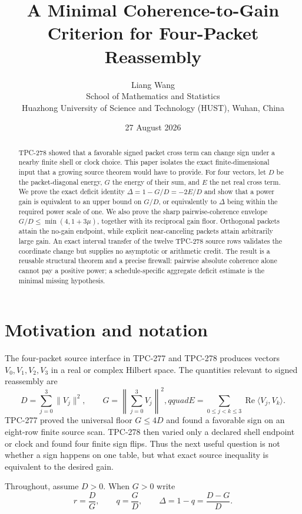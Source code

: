 \documentclass[11pt]{article}
\title{A Minimal Coherence-to-Gain Criterion for Four-Packet Reassembly}
\author{Liang Wang\\
School of Mathematics and Statistics\\
Huazhong University of Science and Technology (HUST), Wuhan, China}
\date{27 August 2026}
\begin{document}
\maketitle

\begin{abstract}
TPC-278 showed that a favorable signed packet cross term can change sign under
a nearby finite shell or clock choice.  This paper isolates the exact
finite-dimensional input that a growing source theorem would have to provide.
For four vectors, let $D$ be the packet-diagonal energy, $G$ the energy of
their sum, and $E$ the net real cross term.  We prove the exact deficit
identity $\Delta=1-G/D=-2E/D$ and show that a power gain is equivalent to an
upper bound on $G/D$, or equivalently to $\Delta$ being within the required
power scale of one.  We also prove the sharp pairwise-coherence envelope
$G/D\leq\min(4,1+3\mu)$, together with its reciprocal gain floor.  Orthogonal
packets attain the no-gain endpoint, while explicit near-canceling packets
attain arbitrarily large gain.  An exact interval transfer of the twelve
TPC-278 source rows validates the coordinate change but supplies no
asymptotic or arithmetic credit.  The result is a reusable structural
theorem and a precise firewall: pairwise absolute coherence alone cannot
pay a positive power; a schedule-specific aggregate deficit estimate is the
minimal missing hypothesis.
\end{abstract}

\section{Motivation and notation}

The four-packet source interface in TPC-277 and TPC-278 produces vectors
$V_0,V_1,V_2,V_3$ in a real or complex Hilbert space.  The quantities relevant
to signed reassembly are
\[
 D=\sum_{j=0}^3\|V_j\|^2,\qquad
 G=\left\|\sum_{j=0}^3V_j\right\|^2,qquad
 E=\sum_{0\leq j<k\leq3}\operatorname{Re}\langle V_j,V_k\rangle.
\]
TPC-277 proved the universal floor $G\leq4D$ and found a favorable sign on
an eight-row finite source scan.  TPC-278 then varied only a declared shell
endpoint or clock and found four finite sign flips.  Thus the next useful
question is not whether a sign happens on one table, but what exact source
inequality is equivalent to the desired gain.

Throughout, assume $D>0$.  When $G>0$ write
\[
 r=\frac DG,\qquad q=\frac GD,\qquad
 \Delta=1-q=\frac{D-G}{D}.
\]
\end{document}

